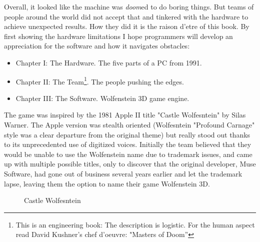 Overall, it looked like the machine was \emph{doom}ed to do boring things. But teams of people around the world did not accept that and tinkered with the hardware to achieve unexpected results. How they did it is the raison d'etre of this book. By first showing the hardware limitations I hope programmers will develop an appreciation for the software and how it navigates obstacles:
\begin{itemize}
\item Chapter I: The Hardware. The five parts of a PC from 1991.
\item Chapter II: The Team\footnote{This is an engineering book: The description is logistic. For the human aspect read David Kushner's chef d'oeuvre: "Masters of Doom''}. The people pushing the edges.
\item Chapter III: The Software. Wolfenstein 3D game engine.
\end{itemize}
\par
{} The game was inspired by the 1981 Apple II title "Castle Wolfesntein" by Silas Warner. The Apple version was stealth oriented (Wolfesntein "Profound Carnage" style was a clear departure from the original theme) but really stood out thanks to its unprecedented use of digitized voices. Initially the team believed that they would be unable to use the Wolfenstein name due to trademark issues, and came up with multiple possible titles, only to discover that the original developer, Muse Software, had gone out of business several years earlier and let the trademark lapse, leaving them the option to name their game Wolfenstein 3D.

\begin{figure}[H]
\centering
{}
\caption{Castle Wolfesntein}
\end{figure}
